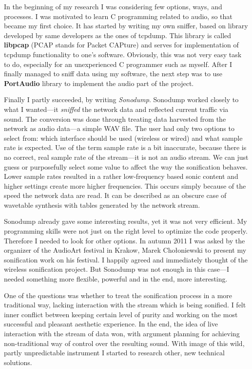 \documentclass[12pt,a4paper,oneside]{report}
\begin{document}
In the beginning of my research I was considering few options, ways, and processes. I was motivated to learn C programming related to audio, so that became my first choice. It has started by writing my own sniffer, based on library developed by same developers as the ones of tcpdump. This library is called \textbf{libpcap} (PCAP stands for Packet CAPture) and serves for implementation of tcpdump functionality to one's software. Obviously, this was not very easy task to do, especially for an unexperienced C programmer such as myself. After I finally managed to sniff data using my software, the next step was to use \textbf{PortAudio} library to implement the audio part of the project.

Finally I partly succeeded, by writing \emph{Sonodump}. Sonodump worked closely to what I wanted---it \emph{sniffed} the network data and reflected current traffic via sound. The conversion was done through treating data harvested from the network as audio data---a simple WAV file. The user had only two options to select from: which interface should be used (wireless or wired) and what sample rate is expected. Use of the term sample rate is a bit inaccurate, because there is no correct, real sample rate of the stream---it is not an audio stream. We can just guess or purposefully select some value to affect the way the sonification behaves. Lower sample rates resulted in a rather low-frequency based sonic content and higher settings create more higher frequencies. This occurs simply because of the speed the network data are read. It can be described as an obscure case of wavetable synthesis with tables generated by the network stream.

Sonodump already gave some interesting results, yet it was not very efficient. My programming skills were not just on the right level to optimize the code properly. Therefore I needed to look for other options. In autumn 2011 I was asked by the organizer of the AudioArt festival in Krakow, Marek Chołoniewski to present my sonification work on his festival. I happily agreed and immediately thought of the wireless sonification project. But Sonodump was not enough in this case---I needed something more flexible, powerful and in the end, more interesting.

One of the questions was whether to treat the sonification process in a more traditional way, lacking interaction with the stream which is being sonified. I felt inner conflict between keeping certain level of purity and working on the most successful and pleasant aesthetic experience. In the end, the idea of live interaction with the stream of data won, with argument planning for achieving non-traditional way of control over the resulting sound. With image of this wild, partly unpredictable instrument I started to research other, new technical solutions.
\end{document}
